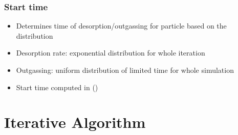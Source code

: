 \subsubsection{Start time}
\begin{itemize}[noitemsep,topsep=0pt, partopsep=0pt]
\item Determines time of desorption/outgassing for particle based on the distribution
\item Desorption rate: exponential distribution for whole iteration
\item Outgassing: uniform distribution of limited time for whole simulation
\item Start time computed in  ()
\end{itemize}


\section{Iterative Algorithm}

